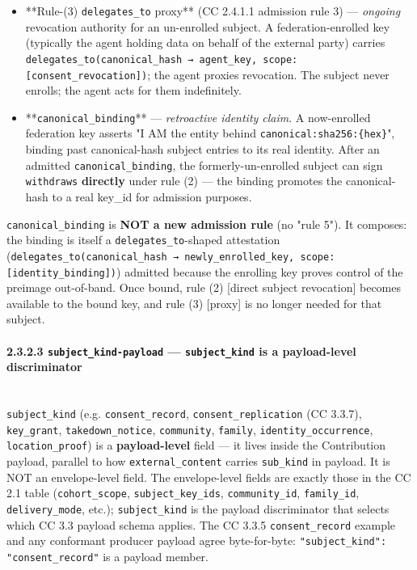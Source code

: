 \documentclass[11pt]{article}
\begin{document}
\begin{itemize}\setlength\itemsep{0pt}
\item **Rule-(3) \texttt{delegates\_to} proxy** (CC 2.4.1.1 admission rule 3) — \textit{ongoing} revocation authority for an un-enrolled subject. A federation-enrolled key (typically the agent holding data on behalf of the external party) carries \texttt{delegates\_to(canonical\_hash → agent\_key, scope: [consent\_revocation])}; the agent proxies revocation. The subject never enrolls; the agent acts for them indefinitely.
\item **\texttt{canonical\_binding}** — \textit{retroactive identity claim}. A now-enrolled federation key asserts "I AM the entity behind \texttt{canonical:sha256:\{hex\}}", binding past canonical-hash subject entries to its real identity. After an admitted \texttt{canonical\_binding}, the formerly-un-enrolled subject can sign \texttt{withdraws} \textbf{directly} under rule (2) — the binding promotes the canonical-hash to a real key\_id for admission purposes.
\end{itemize}


\texttt{canonical\_binding} is \textbf{NOT a new admission rule} (no "rule 5"). It composes: the binding is itself a \texttt{delegates\_to}-shaped attestation (\texttt{delegates\_to(canonical\_hash → newly\_enrolled\_key, scope: [identity\_binding])}) admitted because the enrolling key proves control of the preimage out-of-band. Once bound, rule (2) [direct subject revocation] becomes available to the bound key, and rule (3) [proxy] is no longer needed for that subject.


\paragraph{2.3.2.3 \texttt{subject\_kind-payload} — \texttt{subject\_kind} is a payload-level discriminator}\mbox{}\\


\texttt{subject\_kind} (e.g. \texttt{consent\_record}, \texttt{consent\_replication} (CC 3.3.7), \texttt{key\_grant}, \texttt{takedown\_notice}, \texttt{community}, \texttt{family}, \texttt{identity\_occurrence}, \texttt{location\_proof}) is a \textbf{payload-level} field — it lives inside the Contribution payload, parallel to how \texttt{external\_content} carries \texttt{sub\_kind} in payload. It is NOT an envelope-level field. The envelope-level fields are exactly those in the CC 2.1 table (\texttt{cohort\_scope}, \texttt{subject\_key\_ids}, \texttt{community\_id}, \texttt{family\_id}, \texttt{delivery\_mode}, etc.); \texttt{subject\_kind} is the payload discriminator that selects which CC 3.3 payload schema applies. The CC 3.3.5 \texttt{consent\_record} example and any conformant producer payload agree byte-for-byte: \texttt{"subject\_kind": "consent\_record"} is a payload member.
\end{document}
